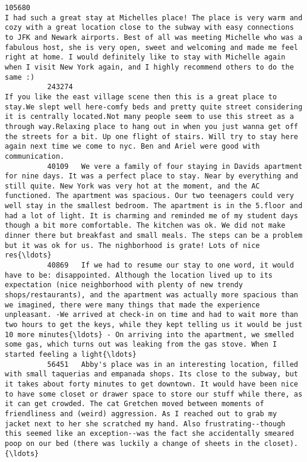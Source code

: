 \documentclass[11pt]{article}
\begin{document}
\begin{Verbatim}[commandchars=\\\{\}]
          105680                                                                                                                                                                                 I had such a great stay at Michelles place! The place is very warm and cozy with a great location close to the subway with easy connections to JFK and Newark airports. Best of all was meeting Michelle who was a fabulous host, she is very open, sweet and welcoming and made me feel right at home. I would definitely like to stay with Michelle again when I visit New York again, and I highly recommend others to do the same :)   
          243274                                                                                                                                                                                     If you like the east village scene then this is a great place to stay.We slept well here-comfy beds and pretty quite street considering it is centrally located.Not many people seem to use this street as a through way.Relaxing place to hang out in when you just wanna get off the streets for a bit. Up one flight of stairs. Will try to stay here again next time we come to nyc. Ben and Ariel were good with communication.   
          40109   We vere a family of four staying in Davids apartment for nine days. It was a perfect place to stay. Near by everything and still quite. New York was very hot at the moment, and the AC functioned. The apartment was spacious. Our two teenagers could very well stay in the smallest bedroom. The apartment is in the 5.floor and had a lot of light. It is charming and reminded me of my student days though a bit more comfortable. The kitchen was ok. We did not make dinner there but breakfast and small meals. The steps can be a problem but it was ok for us. The nighborhood is grate! Lots of nice res{\ldots}   
          40869   If we had to resume our stay to one word, it would have to be: disappointed. Although the location lived up to its expectation (nice neighborhood with plenty of new trendy shops/restaurants), and the apartment was actually more spacious than we imagined, there were many things that made the experience unpleasant. -We arrived at check-in on time and had to wait more than two hours to get the keys, while they kept telling us it would be just 10 more minutes{\ldots} - On arriving into the apartment, we smelled some gas, which turns out was leaking from the gas stove. When I started feeling a light{\ldots}   
          56451   Abby's place was in an interesting location, filled with small taquerias and empanada shops. Its close to the subway, but it takes about forty minutes to get downtown. It would have been nice to have some closet or drawer space to store our stuff while there, as it can get crowded. The cat Gretchen moved between moments of friendliness and (weird) aggression. As I reached out to grab my jacket next to her she scratched my hand. Also frustrating--though this seemed like an exception--was the fact she accidentally smeared poop on our bed (there was luckily a change of sheets in the closet). {\ldots}   

\end{Verbatim}
\end{document}
